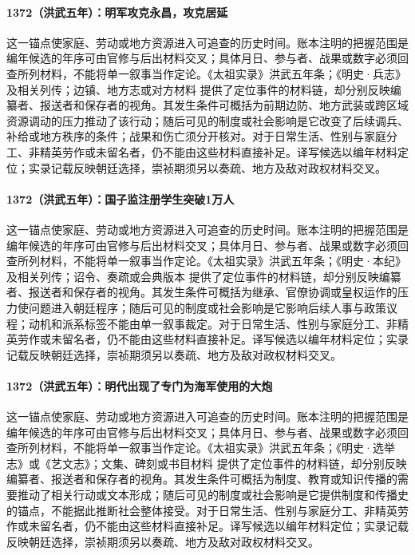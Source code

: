 \paragraph{1372（洪武五年）：明军攻克永昌，攻克居延} 这一锚点使家庭、劳动或地方资源进入可追查的历史时间。账本注明的把握范围是编年候选的年序可由官修与后出材料交叉；具体月日、参与者、战果或数字必须回查所列材料，不能将单一叙事当作定论。《太祖实录》洪武五年条；《明史·兵志》及相关列传；边镇、地方志或对方材料 提供了定位事件的材料链，却分别反映编纂者、报送者和保存者的视角。其发生条件可概括为前期边防、地方武装或跨区域资源调动的压力推动了该行动；随后可见的制度或社会影响是它改变了后续调兵、补给或地方秩序的条件；战果和伤亡须分开核对。对于日常生活、性别与家庭分工、非精英劳作或未留名者，仍不能由这些材料直接补足。译写候选以编年材料定位；实录记载反映朝廷选择，崇祯期须另以奏疏、地方及敌对政权材料交叉。

\paragraph{1372（洪武五年）：国子监注册学生突破1万人} 这一锚点使家庭、劳动或地方资源进入可追查的历史时间。账本注明的把握范围是编年候选的年序可由官修与后出材料交叉；具体月日、参与者、战果或数字必须回查所列材料，不能将单一叙事当作定论。《太祖实录》洪武五年条；《明史·本纪》及相关列传；诏令、奏疏或会典版本 提供了定位事件的材料链，却分别反映编纂者、报送者和保存者的视角。其发生条件可概括为继承、官僚协调或皇权运作的压力使问题进入朝廷程序；随后可见的制度或社会影响是它影响后续人事与政策议程；动机和派系标签不能由单一叙事裁定。对于日常生活、性别与家庭分工、非精英劳作或未留名者，仍不能由这些材料直接补足。译写候选以编年材料定位；实录记载反映朝廷选择，崇祯期须另以奏疏、地方及敌对政权材料交叉。

\paragraph{1372（洪武五年）：明代出现了专门为海军使用的大炮} 这一锚点使家庭、劳动或地方资源进入可追查的历史时间。账本注明的把握范围是编年候选的年序可由官修与后出材料交叉；具体月日、参与者、战果或数字必须回查所列材料，不能将单一叙事当作定论。《太祖实录》洪武五年条；《明史·选举志》或《艺文志》；文集、碑刻或书目材料 提供了定位事件的材料链，却分别反映编纂者、报送者和保存者的视角。其发生条件可概括为制度、教育或知识传播的需要推动了相关行动或文本形成；随后可见的制度或社会影响是它提供制度和传播史的锚点，不能据此推断社会整体接受。对于日常生活、性别与家庭分工、非精英劳作或未留名者，仍不能由这些材料直接补足。译写候选以编年材料定位；实录记载反映朝廷选择，崇祯期须另以奏疏、地方及敌对政权材料交叉。

